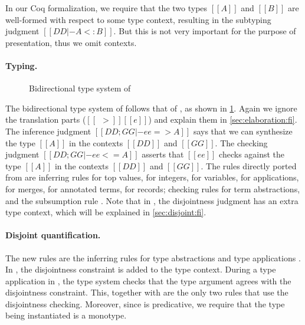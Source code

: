 \begin{remark}
  In our Coq formalization, we require that the two types $[[A]]$ and $[[B]]$ are
  well-formed with respect to some type context, resulting in the subtyping
  judgment $[[DD |- A <: B]]$. But this is not very important
  for the purpose of presentation, thus we omit contexts.
\end{remark}


\paragraph{Typing.}

\begin{figure}
  \centering
  \caption{Bidirectional type system of \fnamee}
  \label{fig:typing:fi}
\end{figure}


The bidirectional type system of \fnamee follows that of \namee, as shown
in \cref{fig:typing:fi}. Again we ignore the translation parts ($[[~~>]] [[e]]$) and explain them in
\cref{sec:elaboration:fi}. The inference judgment $[[ DD; GG |- ee => A  ]]$
says that we can synthesize the type $[[A]]$ in the contexts $[[DD]]$ and $[[GG]]$. The checking judgment
$[[ DD ; GG |- ee <= A  ]]$ asserts that $[[ee]]$ checks against the type $[[A]]$
in the contexts $[[DD]]$ and $[[GG]]$. The rules directly ported from \namee are inferring rules  for top values,
 for integers,  for variables,  for applications,  for merges,
 for annotated terms,  for records; checking rules  for term abstractions, and
the subsumption rule . Note that in , the disjointness judgment has an extra type context, which will be
explained in \cref{sec:disjoint:fi}.

\paragraph{Disjoint quantification.}

The new rules are the inferring rules for type abstractions  and
type applications . In , the disjointness
constraint is added to the type context. During a type application in
, the type system checks that the type argument agrees with the
disjointness constraint. This, together with  are the only two
rules that use the disjointness checking. Moreover, since \fnamee is
predicative, we require that the type being instantiated is a monotype.



